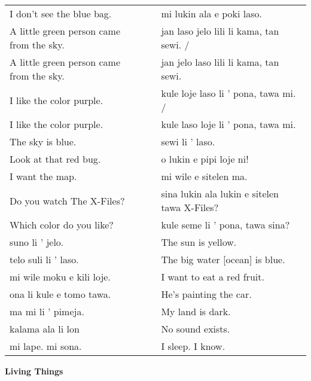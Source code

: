 \begin{supertabular}{p{5,5cm}|ll}
I don't see the blue bag.  && mi lukin ala e poki laso. \\ %
A little green person came from the sky.  && jan laso jelo lili li kama, tan sewi. / \\ %
A little green person came from the sky.  && jan jelo laso lili li kama, tan sewi. \\  %
I like the color purple.  && kule loje laso li ' pona, tawa mi. / \\ %
I like the color purple.  && kule laso loje li ' pona, tawa mi. \\ %
The sky is blue.  && sewi li ' laso. \\ %
Look at that red bug.  && o lukin e pipi loje ni!  \\ %
I want the map.  && mi wile e sitelen ma. \\ %
Do you watch The X-Files?  && sina lukin ala lukin e sitelen tawa X-Files? \\ %
Which color do you like?  && kule seme li ' pona, tawa sina? \\ %
suno li ' jelo.  && The sun is yellow. \\
telo suli li ' laso.  && The big water [ocean] is blue. \\
mi wile moku e kili loje.  && I want to eat a red fruit. \\
ona li kule e tomo tawa.  && He's painting the car. \\
ma mi li ' pimeja. && My land is dark. \\
kalama ala li lon && No sound exists.\\
mi lape. mi sona. && I sleep. I know. \\
\end{supertabular} 

\textbf{Living Things} 
\label{'living_things'}

